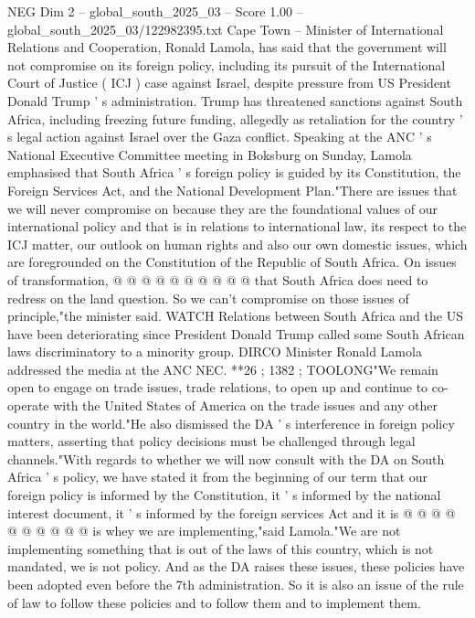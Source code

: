 \begin{textsample}{NEG Dim 2 – global\_south\_2025\_03 – Score 1.00 – global\_south\_2025\_03/122982395.txt}  \label{ex:f2_neg_139}
Cape Town -- Minister of International Relations and Cooperation, Ronald Lamola, has said that the government will not compromise on its foreign policy, including its pursuit of the International Court of Justice ( ICJ ) case against Israel, despite pressure from US President Donald Trump ' s administration.
Trump has threatened sanctions against South Africa, including freezing future funding, allegedly as retaliation for the country ' s legal action against Israel over the Gaza conflict.
Speaking at the ANC ' s National Executive Committee meeting in Boksburg on Sunday, Lamola emphasised that South Africa ' s foreign policy is guided by its Constitution, the Foreign Services Act, and the National Development Plan."There are issues that we will never compromise on because they are the foundational values of our international policy and that is in relations to international law, its respect to the ICJ matter, our outlook on human rights and also our own domestic issues, which are foregrounded on the Constitution of the Republic of South Africa.
On issues of transformation, @ @ @ @ @ @ @ @ @ @ that South Africa does need to redress on the land question.
So we can't compromise on those issues of principle,"the minister said.
WATCH Relations between South Africa and the US have been deteriorating since President Donald Trump called some South African laws discriminatory to a minority group.
DIRCO Minister Ronald Lamola addressed the media at the ANC NEC. **26 ; 1382 ; TOOLONG"We remain open to engage on trade issues, trade relations, to open up and continue to co-operate with the United States of America on the trade issues and any other country in the world."He also dismissed the DA ' s interference in foreign policy matters, asserting that policy decisions must be challenged through legal channels."With regards to whether we will now consult with the DA on South Africa ' s policy, we have stated it from the beginning of our term that our foreign policy is informed by the Constitution, it ' s informed by the national interest document, it ' s informed by the foreign services Act and it is @ @ @ @ @ @ @ @ @ @ is whey we are implementing,"said Lamola."We are not implementing something that is out of the laws of this country, which is not mandated, we is not policy.
And as the DA raises these issues, these policies have been adopted even before the 7th administration.
So it is also an issue of the rule of law to follow these policies and to follow them and to implement them.

\end{textsample}
